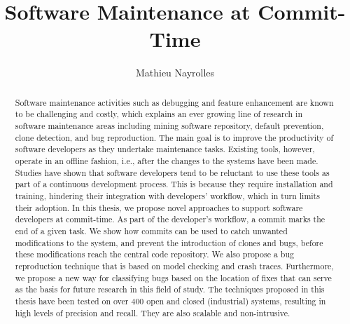 \documentclass[12pt]{report}
\author{Mathieu Nayrolles}
\title{Software Maintenance at Commit-Time}
\begin{document}
\begin{abstract}
  Software maintenance activities such as debugging and feature
  enhancement are known to be challenging and costly, which explains an
  ever growing line of research in software maintenance areas including
  mining software repository, default prevention, clone detection, and bug
  reproduction. The main goal is to improve the productivity of software
  developers as they undertake maintenance tasks. Existing tools, however,
  operate in an offline fashion, i.e., after the changes to the systems
  have been made. Studies have shown that software developers tend to be
  reluctant to use these tools as part of a continuous development
  process. This is because they require installation and training,
  hindering their integration with developers' workflow, which in turn
  limits their adoption. In this thesis, we propose novel approaches to
  support software developers at commit-time. As part of the developer's
  workflow, a commit marks the end of a given task. We show how commits
  can be used to catch unwanted modifications to the system, and prevent
  the introduction of clones and bugs, before these modifications reach
  the central code repository. We also propose a bug reproduction
  technique that is based on model checking and crash traces. Furthermore,
  we propose a new way for classifying bugs based on the location of fixes
  that can serve as the basis for future research in this field of study.
  The techniques proposed in this thesis have been tested on over 400 open
  and closed (industrial) systems, resulting in high levels of precision
  and recall. They are also scalable and non-intrusive.
\end{abstract}
\end{document}
